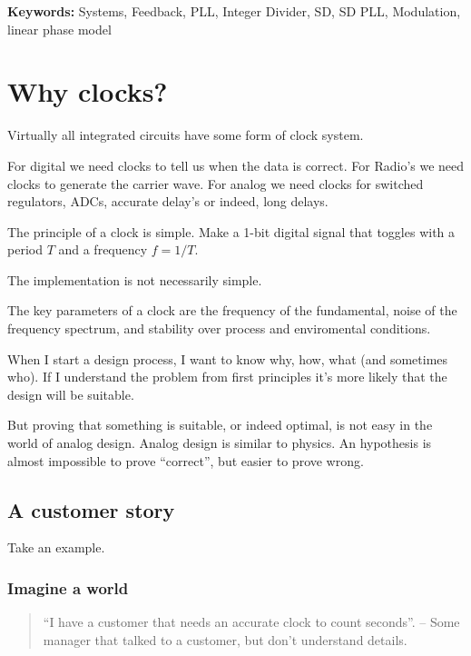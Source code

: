\textbf{Keywords:} Systems, Feedback, PLL, Integer Divider, SD, SD PLL,
Modulation, linear phase model

\section{Why clocks?}\label{why-clocks}

Virtually all integrated circuits have some form of clock system.

For digital we need clocks to tell us when the data is correct. For
Radio's we need clocks to generate the carrier wave. For analog we need
clocks for switched regulators, ADCs, accurate delay's or indeed, long
delays.

The principle of a clock is simple. Make a 1-bit digital signal that
toggles with a period \(T\) and a frequency \(f = 1/T\).

The implementation is not necessarily simple.

The key parameters of a clock are the frequency of the fundamental,
noise of the frequency spectrum, and stability over process and
enviromental conditions.

When I start a design process, I want to know why, how, what (and
sometimes who). If I understand the problem from first principles it's
more likely that the design will be suitable.

But proving that something is suitable, or indeed optimal, is not easy
in the world of analog design. Analog design is similar to physics. An
hypothesis is almost impossible to prove ``correct'', but easier to
prove wrong.

\subsection{A customer story}\label{a-customer-story}

Take an example.

\subsubsection{Imagine a world}\label{imagine-a-world}

\begin{quote}
``I have a customer that needs an accurate clock to count seconds''. --
Some manager that talked to a customer, but don't understand details.
\end{quote}


